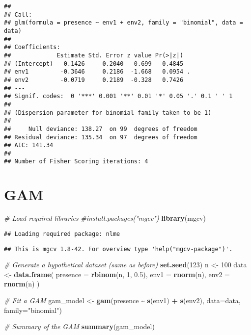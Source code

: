 \documentclass[
]{krantz}
\newenvironment{Shaded}{\begin{snugshade}}{\end{snugshade}}
\newcommand{\AttributeTok}[1]{\textcolor[rgb]{0.27,0.27,0.27}{#1}}
\newcommand{\CommentTok}[1]{\textcolor[rgb]{0.37,0.37,0.37}{\textit{#1}}}
\newcommand{\DecValTok}[1]{\textcolor[rgb]{0.06,0.06,0.06}{#1}}
\newcommand{\FloatTok}[1]{\textcolor[rgb]{0.06,0.06,0.06}{#1}}
\newcommand{\FunctionTok}[1]{\textcolor[rgb]{0.27,0.27,0.27}{\textbf{#1}}}
\newcommand{\NormalTok}[1]{#1}
\newcommand{\OtherTok}[1]{\textcolor[rgb]{0.37,0.37,0.37}{#1}}
\newcommand{\SpecialCharTok}[1]{\textcolor[rgb]{0.43,0.43,0.43}{\textbf{#1}}}
\newcommand{\StringTok}[1]{\textcolor[rgb]{0.5,0.5,0.5}{#1}}
\begin{document}
\begin{verbatim}
## 
## Call:
## glm(formula = presence ~ env1 + env2, family = "binomial", data = data)
## 
## Coefficients:
##             Estimate Std. Error z value Pr(>|z|)  
## (Intercept)  -0.1426     0.2040  -0.699   0.4845  
## env1         -0.3646     0.2186  -1.668   0.0954 .
## env2         -0.0719     0.2189  -0.328   0.7426  
## ---
## Signif. codes:  0 '***' 0.001 '**' 0.01 '*' 0.05 '.' 0.1 ' ' 1
## 
## (Dispersion parameter for binomial family taken to be 1)
## 
##     Null deviance: 138.27  on 99  degrees of freedom
## Residual deviance: 135.34  on 97  degrees of freedom
## AIC: 141.34
## 
## Number of Fisher Scoring iterations: 4
\end{verbatim}

\hypertarget{gam}{%
\section{GAM}\label{gam}}

\begin{Shaded}
\begin{Highlighting}[]
\CommentTok{\# Load required libraries}
\CommentTok{\#install.packages("mgcv")}
\FunctionTok{library}\NormalTok{(mgcv)}
\end{Highlighting}
\end{Shaded}

\begin{verbatim}
## Loading required package: nlme
\end{verbatim}

\begin{verbatim}
## This is mgcv 1.8-42. For overview type 'help("mgcv-package")'.
\end{verbatim}

\begin{Shaded}
\begin{Highlighting}[]
\CommentTok{\# Generate a hypothetical dataset (same as before)}
\FunctionTok{set.seed}\NormalTok{(}\DecValTok{123}\NormalTok{)}
\NormalTok{n }\OtherTok{\textless{}{-}} \DecValTok{100}
\NormalTok{data }\OtherTok{\textless{}{-}} \FunctionTok{data.frame}\NormalTok{(}
  \AttributeTok{presence =} \FunctionTok{rbinom}\NormalTok{(n, }\DecValTok{1}\NormalTok{, }\FloatTok{0.5}\NormalTok{),}
  \AttributeTok{env1 =} \FunctionTok{rnorm}\NormalTok{(n),}
  \AttributeTok{env2 =} \FunctionTok{rnorm}\NormalTok{(n)}
\NormalTok{)}

\CommentTok{\# Fit a GAM}
\NormalTok{gam\_model }\OtherTok{\textless{}{-}} \FunctionTok{gam}\NormalTok{(presence }\SpecialCharTok{\textasciitilde{}} \FunctionTok{s}\NormalTok{(env1) }\SpecialCharTok{+} \FunctionTok{s}\NormalTok{(env2), }\AttributeTok{data=}\NormalTok{data, }\AttributeTok{family=}\StringTok{"binomial"}\NormalTok{)}

\CommentTok{\# Summary of the GAM}
\FunctionTok{summary}\NormalTok{(gam\_model)}
\end{Highlighting}
\end{Shaded}
\end{document}
